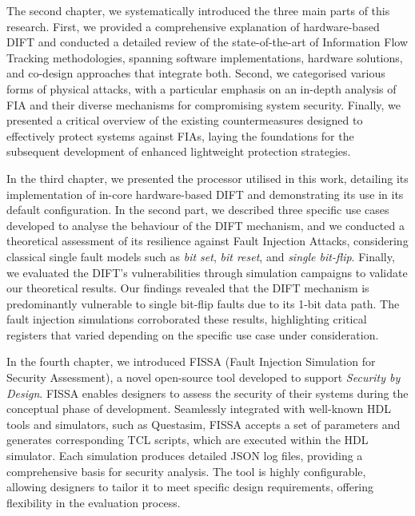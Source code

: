 The second chapter, we systematically introduced the three main parts of this research. First, we provided a comprehensive explanation of hardware-based DIFT and conducted a detailed review of the state-of-the-art of Information Flow Tracking methodologies, spanning software implementations, hardware solutions, and co-design approaches that integrate both. Second, we categorised various forms of physical attacks, with a particular emphasis on an in-depth analysis of FIA and their diverse mechanisms for compromising system security. Finally, we presented a critical overview of the existing countermeasures designed to effectively protect systems against FIAs, laying the foundations for the subsequent development of enhanced lightweight protection strategies.

In the third chapter, we presented the processor utilised in this work, detailing its implementation of in-core hardware-based DIFT and demonstrating its use in its default configuration. In the second part, we described three specific use cases developed to analyse the behaviour of the DIFT mechanism, and we conducted a theoretical assessment of its resilience against Fault Injection Attacks, considering classical single fault models such as \textit{bit set}, \textit{bit reset}, and \textit{single bit-flip}. Finally, we evaluated the DIFT's vulnerabilities through simulation campaigns to validate our theoretical results. Our findings revealed that the DIFT mechanism is predominantly vulnerable to single bit-flip faults due to its 1-bit data path. The fault injection simulations corroborated these results, highlighting critical registers that varied depending on the specific use case under consideration.

In the fourth chapter, we introduced FISSA (Fault Injection Simulation for Security Assessment), a novel open-source tool developed to support \textit{Security by Design}. FISSA enables designers to assess the security of their systems during the conceptual phase of development. Seamlessly integrated with well-known HDL tools and simulators, such as Questasim, FISSA accepts a set of parameters and generates corresponding TCL scripts, which are executed within the HDL simulator. Each simulation produces detailed JSON log files, providing a comprehensive basis for security analysis. The tool is highly configurable, allowing designers to tailor it to meet specific design requirements, offering flexibility in the evaluation process.

